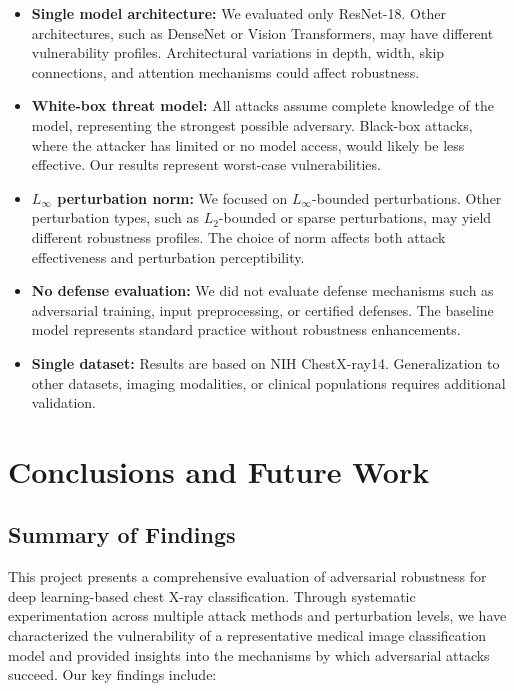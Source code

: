 \documentclass[12pt,a4paper]{article}
\begin{document}
\begin{itemize}[leftmargin=*]
    \item \textbf{Single model architecture:} We evaluated only ResNet-18. Other architectures, such as DenseNet or Vision Transformers, may have different vulnerability profiles. Architectural variations in depth, width, skip connections, and attention mechanisms could affect robustness.
    
    \item \textbf{White-box threat model:} All attacks assume complete knowledge of the model, representing the strongest possible adversary. Black-box attacks, where the attacker has limited or no model access, would likely be less effective. Our results represent worst-case vulnerabilities.
    
    \item \textbf{$L_\infty$ perturbation norm:} We focused on $L_\infty$-bounded perturbations. Other perturbation types, such as $L_2$-bounded or sparse perturbations, may yield different robustness profiles. The choice of norm affects both attack effectiveness and perturbation perceptibility.
    
    \item \textbf{No defense evaluation:} We did not evaluate defense mechanisms such as adversarial training, input preprocessing, or certified defenses. The baseline model represents standard practice without robustness enhancements.
    
    \item \textbf{Single dataset:} Results are based on NIH ChestX-ray14. Generalization to other datasets, imaging modalities, or clinical populations requires additional validation.
\end{itemize}

\section{Conclusions and Future Work}
\label{sec:conclusions}

\subsection{Summary of Findings}

This project presents a comprehensive evaluation of adversarial robustness for deep learning-based chest X-ray classification. Through systematic experimentation across multiple attack methods and perturbation levels, we have characterized the vulnerability of a representative medical image classification model and provided insights into the mechanisms by which adversarial attacks succeed. Our key findings include:
\end{document}
